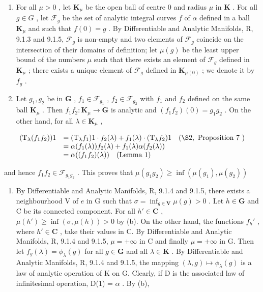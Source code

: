 \begin{enumerate}
\def\labelenumi{(\alph{enumi})}
\item
  For all \(\mu > 0\) , let \(\mathbf{K}_{\mu}\) be the open ball of centre 0 and radius \(\mu\) in \(\mathbf{K}\) . For all \(g \in G\) , let \(\mathcal{F}_g\) be the set of analytic integral curves \(f\) of \(\alpha\) defined in a ball \(\mathbf{K}_{\mu}\) and such that \(f(0) = g\) . By Differentiable and Analytic Manifolds, R, 9.1.3 and 9.1.5, \(\mathcal{F}_g\) is non-empty and two elements of \(\mathcal{F}_g\) coincide on the intersection of their domains of definition; let \(\mu(g)\) be the least upper bound of the numbers \(\mu\) such that there exists an element of \(\mathcal{F}_g\) defined in \(\mathbf{K}_{\mu}\) ; there exists a unique element of \(\mathcal{F}_g\) defined in \(\mathbf{K}_{\mu(0)}\) ; we denote it by \(f_g\) .
\item
  Let \(g_1, g_2\) be in \(\mathbf{G}\) , \(f_1 \in \mathcal{F}_{g_1}\) , \(f_2 \in \mathcal{F}_{g_2}\) with \(f_1\) and \(f_2\) defined on the same ball \(\mathbf{K}_\mu\) . Then \(f_1f_2: \mathbf{K}_\mu \to \mathbf{G}\) is analytic and \((f_1f_2)(0) = g_1g_2\) . On the other hand, for all \(\lambda \in \mathbf{K}_\mu\) ,
\end{enumerate}

\[
\begin{array}{r l} (\mathrm{T} _ {\lambda} (f _ {1} f _ {2})) 1 & = (\mathrm{T} _ {\lambda} f _ {1}) 1 \cdot f _ {2} (\lambda) + f _ {1} (\lambda) \cdot (\mathrm{T} _ {\lambda} f _ {2}) 1 \quad (\S 2, \text { Proposition   7 }) \\ & = \alpha (f _ {1} (\lambda)) f _ {2} (\lambda) + f _ {1} (\lambda) \alpha (f _ {2} (\lambda)) \\ & = \alpha ((f _ {1} f _ {2}) (\lambda)) \quad \text {(Lemma   1)} \end{array}
\]

and hence \(f_{1}f_{2}\in \mathcal{F}_{g_{1}g_{2}}\) . This proves that \(\mu (g_1g_2)\geqslant \inf (\mu (g_1),\mu (g_2))\)

\begin{enumerate}
\def\labelenumi{(\alph{enumi})}
\setcounter{enumi}{2}
\tightlist
\item
  By Differentiable and Analytic Manifolds, R, 9.1.4 and 9.1.5, there exists a neighbourhood V of \(e\) in G such that \(\sigma = \inf_{g \in \mathbf{V}} \mu(g) > 0\) . Let \(h \in \mathbf{G}\) and C be its connected component. For all \(h' \in \mathbf{C}\) , \(\mu(h') \geqslant \inf(\sigma, \mu(h)) > 0\) by (b). On the other hand, the functions \(f_h'\) , where \(h' \in \mathbf{C}\) , take their values in C. By Differentiable and Analytic Manifolds, R, 9.1.4 and 9.1.5, \(\mu = +\infty\) in C and finally \(\mu = +\infty\) in G. Then let \(f_g(\lambda) = \phi_{\lambda}(g)\) for all \(g \in \mathbf{G}\) and all \(\lambda \in \mathbf{K}\) . By Differentiable and Analytic Manifolds, R, 9.1.4 and 9.1.5, the mapping \((\lambda, g) \mapsto \phi_{\lambda}(g)\) is a law of analytic operation of K on G. Clearly, if D is the associated law of infinitesimal operation, D(1) = \(\alpha\) . By (b),
\end{enumerate}

